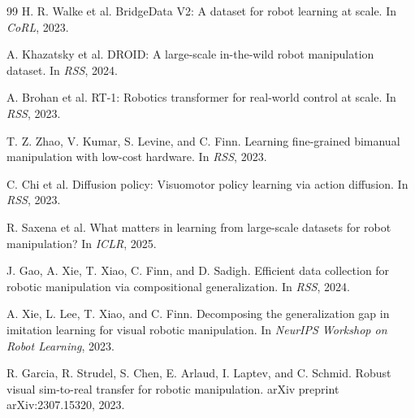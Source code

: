\documentclass[10pt,twocolumn,letterpaper]{article}
\begin{document}
\begin{thebibliography}{99}
H. R. Walke et al.
\newblock BridgeData V2: A dataset for robot learning at scale.
\newblock In \emph{CoRL}, 2023.

A. Khazatsky et al.
\newblock DROID: A large-scale in-the-wild robot manipulation dataset.
\newblock In \emph{RSS}, 2024.

A. Brohan et al.
\newblock RT-1: Robotics transformer for real-world control at scale.
\newblock In \emph{RSS}, 2023.

T. Z. Zhao, V. Kumar, S. Levine, and C. Finn.
\newblock Learning fine-grained bimanual manipulation with low-cost hardware.
\newblock In \emph{RSS}, 2023.

C. Chi et al.
\newblock Diffusion policy: Visuomotor policy learning via action diffusion.
\newblock In \emph{RSS}, 2023.

R. Saxena et al.
\newblock What matters in learning from large-scale datasets for robot manipulation?
\newblock In \emph{ICLR}, 2025.

J. Gao, A. Xie, T. Xiao, C. Finn, and D. Sadigh.
\newblock Efficient data collection for robotic manipulation via compositional generalization.
\newblock In \emph{RSS}, 2024.

A. Xie, L. Lee, T. Xiao, and C. Finn.
\newblock Decomposing the generalization gap in imitation learning for visual robotic manipulation.
\newblock In \emph{NeurIPS Workshop on Robot Learning}, 2023.

R. Garcia, R. Strudel, S. Chen, E. Arlaud, I. Laptev, and C. Schmid.
\newblock Robust visual sim-to-real transfer for robotic manipulation.
\newblock arXiv preprint arXiv:2307.15320, 2023.

\end{thebibliography}
\end{document}
